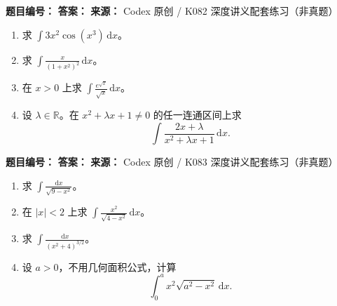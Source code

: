 
\begin{problemBox}
\begin{problemMeta}
\textbf{题目编号：} \quad
\textbf{答案：} \quad
\textbf{来源：} Codex 原创 / K082 深度讲义配套练习（非真题）
\end{problemMeta}
\begin{enumerate}
  \item[\textbf{A}] 求 \(\displaystyle\int3x^2\cos(x^3)\,\mathrm dx\)。
  \item[\textbf{B}] 求 \(\displaystyle\int\frac{x}{(1+x^2)^2}\,\mathrm dx\)。
  \item[\textbf{C}] 在 \(x>0\) 上求
  \(\displaystyle\int\frac{e^{\sqrt x}}{\sqrt x}\,\mathrm dx\)。
  \item[\textbf{M}] 设 \(\lambda\in\mathbb R\)。在
  \(x^2+\lambda x+1\ne0\) 的任一连通区间上求
  \[
  \int\frac{2x+\lambda}{x^2+\lambda x+1}\,\mathrm dx.
  \]
\end{enumerate}
\end{problemBox}

\begin{problemBox}
\begin{problemMeta}
\textbf{题目编号：} \quad
\textbf{答案：} \quad
\textbf{来源：} Codex 原创 / K083 深度讲义配套练习（非真题）
\end{problemMeta}
\begin{enumerate}
  \item[\textbf{A}] 求
  \(\displaystyle\int\frac{\mathrm dx}{\sqrt{9-x^2}}\)。
  \item[\textbf{B}] 在 \(|x|<2\) 上求
  \(\displaystyle\int\frac{x^2}{\sqrt{4-x^2}}\,\mathrm dx\)。
  \item[\textbf{C}] 求
  \(\displaystyle\int\frac{\mathrm dx}{(x^2+4)^{3/2}}\)。
  \item[\textbf{M}] 设 \(a>0\)，不用几何面积公式，计算
  \[
  \int_0^a x^2\sqrt{a^2-x^2}\,\mathrm dx.
  \]
\end{enumerate}
\end{problemBox}

